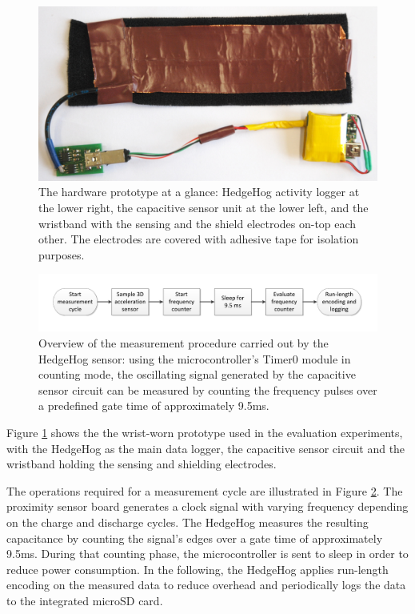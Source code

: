 \documentclass[runningheads,a4paper]{llncs}
\begin{document}
\begin{figure}[t]
	\centering
		\includegraphics[width=\textwidth]{Images/capacitive_sensor_wristband_2.jpg}
	\caption{The hardware prototype at a glance: HedgeHog activity logger at the lower right, the capacitive sensor unit at the lower left, and the wristband with the sensing and the shield electrodes on-top each other. The electrodes are covered with adhesive tape for isolation purposes.}
	\label{fig:cap_sensor}
\end{figure}

\begin{figure}[t]
	\centering
 		\includegraphics[trim=1cm 1cm 1cm 1cm,clip,width=\textwidth]{Images/pseudocode.pdf}
	\caption{Overview of the measurement procedure carried out by the HedgeHog sensor: using the microcontroller's Timer0 module in counting mode, the oscillating signal generated by the capacitive sensor circuit can be measured by counting the frequency pulses over a predefined gate time of approximately 9.5ms.}
	\label{fig:pseudocode}
\end{figure}


Figure \ref{fig:cap_sensor} shows the the wrist-worn prototype used in the evaluation experiments, with the HedgeHog as the main data logger, the capacitive sensor circuit and the wristband holding the sensing and shielding electrodes.

The operations required for a measurement cycle are illustrated in Figure \ref{fig:pseudocode}. The proximity sensor board generates a clock signal with varying frequency depending on the charge and discharge cycles. The HedgeHog measures the resulting capacitance by counting the signal's edges over a gate time of approximately 9.5ms. During that counting phase, the microcontroller is sent to sleep in order to reduce power consumption. In the following, the HedgeHog applies run-length encoding on the measured data to reduce overhead and periodically logs the data to the integrated microSD card.
\end{document}
